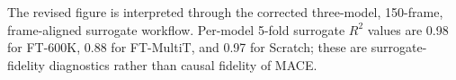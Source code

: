 The revised figure is interpreted through the corrected three-model, 150-frame, frame-aligned surrogate workflow. Per-model 5-fold surrogate $R^2$ values are 0.98 for FT-600K, 0.88 for FT-MultiT, and 0.97 for Scratch; these are surrogate-fidelity diagnostics rather than causal fidelity of MACE.
